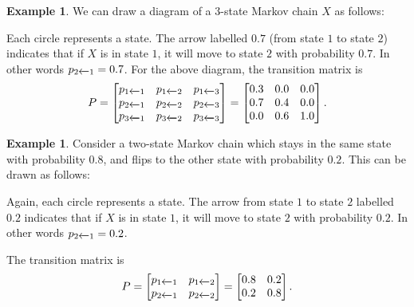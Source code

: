 \documentclass[reqno]{amsart}
\theoremstyle{definition}
\newtheorem{example}[theorem]{Example}
\begin{document}
\begin{example}\label{eg-markov-ii}
 We can draw a diagram of a $3$-state Markov chain $X$ as follows:
 \begin{center}
 \end{center}
 Each circle represents a state.  The arrow labelled $0.7$
 (from state $1$ to state $2$) indicates that if $X$ is in state $1$,
 it will move to state $2$ with probability $0.7$.  In other words
 $p_{2\xleftarrow{}1}=0.7$.  For the above diagram, the transition matrix is
 \[ P = \left[\begin{matrix}
     p_{1\xleftarrow{}1} & p_{1\xleftarrow{}2} & p_{1\xleftarrow{}3} \\
     p_{2\xleftarrow{}1} & p_{2\xleftarrow{}2} & p_{2\xleftarrow{}3} \\
     p_{3\xleftarrow{}1} & p_{3\xleftarrow{}2} & p_{3\xleftarrow{}3}
    \end{matrix}\right] = \left[\begin{matrix}
     0.3 & 0.0 & 0.0 \\
     0.7 & 0.4 & 0.0 \\
     0.0 & 0.6 & 1.0
    \end{matrix}\right].
 \]
\end{example}

\begin{example}\label{eg-markov-i}
 Consider a two-state Markov chain which stays in the same state with
 probability $0.8$, and flips to the other state with probability
 $0.2$.  This can be drawn as follows:
 \begin{center}
 \end{center}
 Again, each circle represents a state.  The arrow from state $1$ to state
 $2$ labelled $0.2$ indicates that if $X$ is in state $1$, it will
 move to state $2$ with probability $0.2$.  In other words
 $p_{2\xleftarrow{}1}=0.2$.  

 The transition matrix is 
 \[ P = \left[\begin{matrix} p_{1\xleftarrow{}1} & p_{1\xleftarrow{}2} \\ 
             p_{2\xleftarrow{}1} & p_{2\xleftarrow{}2} \end{matrix}\right] =
    \left[\begin{matrix} 0.8 & 0.2\\ 0.2 & 0.8 \end{matrix}\right].
 \]
\end{example}
\end{document}
